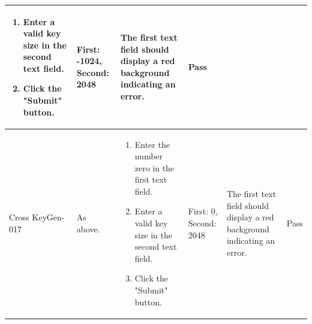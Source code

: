 \documentclass[]{final_report}
\theoremstyle{definition}
\begin{document}
\begin{longtable}{|p{1.5cm}|p{2.5cm}|p{3.5cm}|p{2.5cm}|p{3cm}|p{2cm}|}
\begin{enumerate}
  \item Enter a valid key size in the second text field.
  \item Click the "Submit" button.
  \end{enumerate} & First: -1024, Second: 2048 & The first text field should display a red background indicating an error. & Pass \\
  \hline
  Cross
  KeyGen-017 & As above. & 
  \begin{enumerate}
  \item Enter the number zero in the first text field.
  \item Enter a valid key size in the second text field.
  \item Click the "Submit" button.
  \end{enumerate} & First: 0, Second: 2048 & The first text field should display a red background indicating an error. & Pass \\
   \hline
  \end{longtable}
\end{document}
